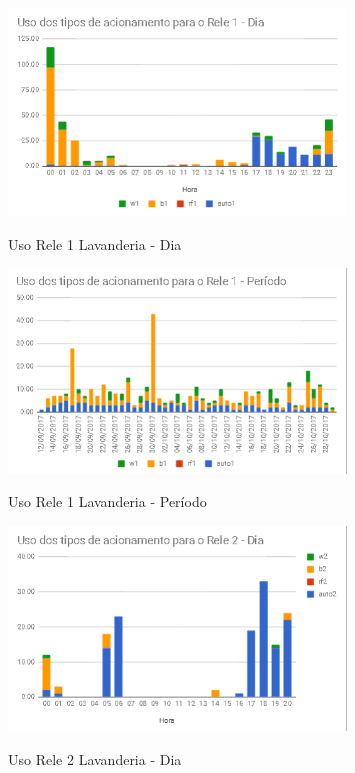 \begin{figure}[H]
	\centering
	\caption{Uso Rele 1 Lavanderia - Dia}
	\includegraphics[width=0.8\textwidth]{usorele1Lavanderia}
	\label{fig:usorele1Lavanderia}
\end{figure}

\begin{figure}[H]
	\centering
	\caption{Uso Rele 1 Lavanderia - Período}
	\includegraphics[width=0.8\textwidth]{Usorele1lavanderiaperiodo}
	\label{fig:Usorele1lavanderiaperiodo}
\end{figure}

\begin{figure}[H]
	\centering
	\caption{Uso Rele 2 Lavanderia - Dia}
	\includegraphics[width=0.8\textwidth]{UsoRele2LavanderiaDia}
	\label{fig:UsoRele2LavanderiaDia}
\end{figure}


